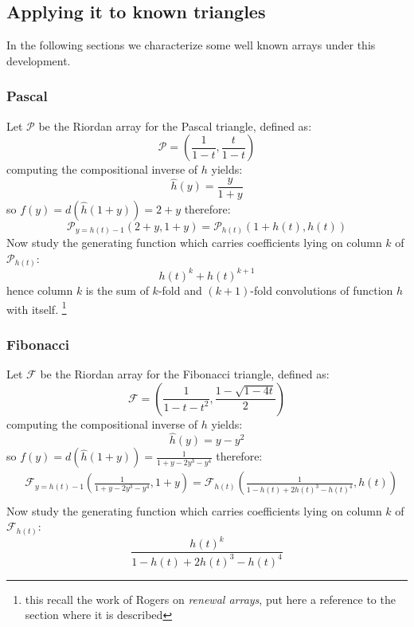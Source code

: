 \subsection{Applying it to known triangles}

In the following sections we characterize some well known 
arrays under this development.

\subsubsection{Pascal}
Let $\mathcal{P}$ be the Riordan array for the Pascal triangle,
defined as:
\begin{displaymath} 
    \mathcal{P} = \left(\frac{1}{1-t}, \frac{t}{1-t}  \right)
\end{displaymath} 
computing the compositional inverse of $h$ yields:
\begin{displaymath} 
    \hat{h}(y) = \frac{y}{1+y}
\end{displaymath} 
so $f(y)=d(\hat{h}(1+y))=2+y$ therefore:
\begin{displaymath} 
    \mathcal{P}_{y=h(t)-1}\left( 2+y, 1+y \right)= \mathcal{P}_{h(t)}\left( 1+h(t), h(t) \right)
\end{displaymath} 
Now study the generating function which carries coefficients lying on column $k$
of $\mathcal{P}_{h(t)}$:
\begin{displaymath} 
    h(t)^k + h(t)^{k+1}
\end{displaymath} 
hence column $k$ is the sum of $k$-fold and $(k+1)$-fold convolutions 
of function $h$ with itself. \footnote{this recall the work of Rogers on \emph{renewal arrays}, 
put here a reference to the section where it is described}

\subsubsection{Fibonacci}
Let $\mathcal{F}$ be the Riordan array for the Fibonacci triangle,
defined as:
\begin{displaymath} 
    \mathcal{F} = \left(\frac{1}{1-t-t^2}, \frac{1-\sqrt{1-4t}}{2}  \right)
\end{displaymath} 
computing the compositional inverse of $h$ yields:
\begin{displaymath} 
    \hat{h}(y) = y - y^2
\end{displaymath} 
so $f(y)=d(\hat{h}(1+y))=\frac{1}{1+y-2y^3-y^4}$ therefore:
\begin{displaymath} 
    \begin{split} 
        & \mathcal{F}_{y=h(t)-1}\left( \frac{1}{1+y-2y^3-y^4}, 1+y \right) = \mathcal{F}_{h(t)}\left( \frac{1}{1-h(t)+2h(t)^3-h(t)^4}, h(t) \right)\\
    \end{split} 
\end{displaymath} 
Now study the generating function which carries coefficients lying on column $k$
of $\mathcal{F}_{h(t)}$:
\begin{displaymath} 
    \frac{h(t)^k}{1-h(t)+2h(t)^3-h(t)^4}
\end{displaymath} 

